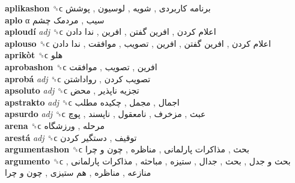 \textbf{aplikashon} ␝ϲ   برنامه کاربردی ,  شویه ,  لوسیون ,  پوشش   \\
\textbf{aplo} α   سیب ,  مردمک چشم   \\
\textbf{aploudí} \emph{adj}  ␝ϲ   اعلام کردن ,  افرین گفتن ,  افرین ,  ندا دادن   \\
\textbf{aplouso} ␝ϲ   اعلام کردن ,  افرین گفتن ,  افرین ,  تصویب ,  موافقت ,  ندا دادن   \\
\textbf{aprikòt} ␝ϲ   هلو   \\
\textbf{aprobashon} ␝ϲ   افرین ,  تصویب ,  موافقت   \\
\textbf{aprobá} \emph{adj}  ␝ϲ   تصویب کردن ,  رواداشتن   \\
\textbf{apsoluto} \emph{adj}  ␝ϲ   تجزیه ناپذیر ,  محض   \\
\textbf{apstrakto} \emph{adj}  ␝ϲ   اجمال ,  مجمل ,  چکیده مطلب   \\
\textbf{apsurdo} \emph{adj}  ␝ϲ   عبث ,  مزخرف ,  نامعقول ,  ناپسند ,  پوچ   \\
\textbf{arena} ␝ϲ   مرحله ,  ورزشگاه   \\
\textbf{arestá} \emph{adj}  ␝ϲ   توقیف ,  دستگیر کردن   \\
\textbf{argumentashon} ␝ϲ   بحث ,  مذاکرات پارلمانی ,  مناظره ,  چون و چرا   \\
\textbf{argumento} ␝ϲ   بحث و جدل ,  بحث ,  جدال ,  ستیزه ,  مباحثه ,  مذاکرات پارلمانی ,  منازعه ,  مناظره ,  هم ستیزی ,  چون و چرا   \\
